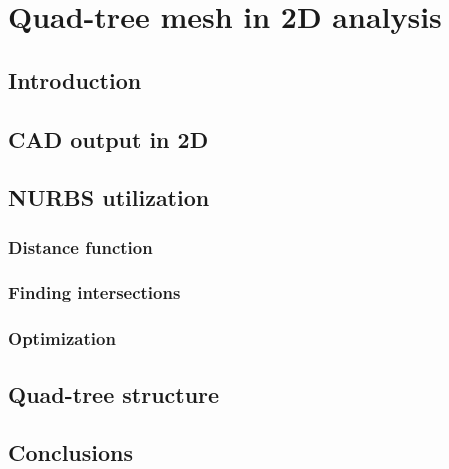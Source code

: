 
\chapter{Quad-tree mesh in 2D analysis}

\section{Introduction}

\section{CAD output in 2D}

\section{NURBS utilization}

    \subsection{Distance function}

    \subsection{Finding intersections}

    \subsection{Optimization}

\section{Quad-tree structure}

\section{Conclusions}